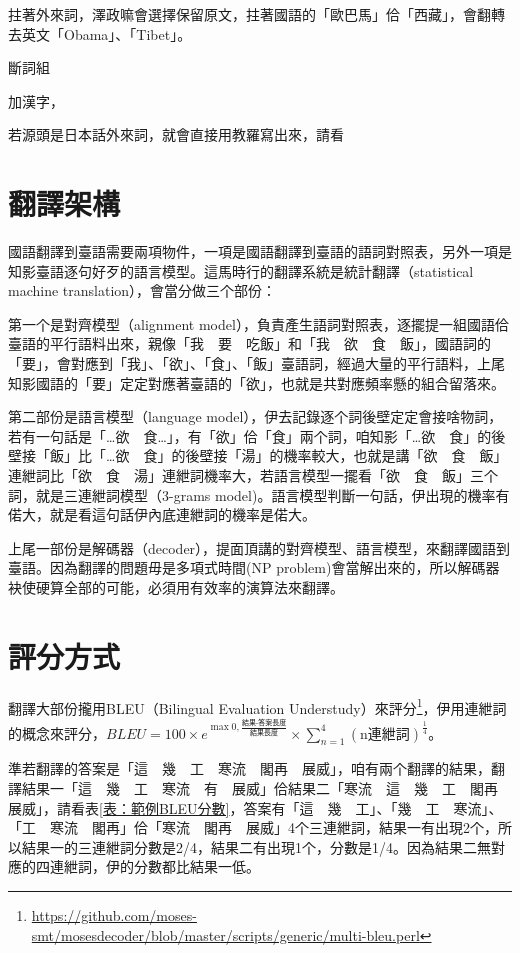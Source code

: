 \documentclass[final,oneside,onecolumn,12pt,a4paper]{book}%
\begin{document}
拄著外來詞，澤政嘛會選擇保留原文，拄著國語的「歐巴馬」佮「西藏」，會翻轉去英文「Obama」、「Tibet」。

斷詞組

加漢字，

若源頭是日本話外來詞，就會直接用教羅寫出來，請看

\section{翻譯架構}
\label{節：翻譯架構}
國語翻譯到臺語需要兩項物件，一項是國語翻譯到臺語的語詞對照表，另外一項是知影臺語逐句好歹的語言模型。這馬時行的翻譯系統是統計翻譯（statistical machine translation），會當分做三个部份：

第一个是對齊模型（alignment model），負責產生語詞對照表，逐擺提一組國語佮臺語的平行語料出來，親像「我　要　吃飯」和「我　欲　食　飯」，國語詞的「要」，會對應到「我」、「欲」、「食」、「飯」臺語詞，經過大量的平行語料，上尾知影國語的「要」定定對應著臺語的「欲」，也就是共對應頻率懸的組合留落來。

第二部份是語言模型（language model），伊去記錄逐个詞後壁定定會接啥物詞，若有一句話是「…欲　食…」，有「欲」佮「食」兩个詞，咱知影「…欲　食」的後壁接「飯」比「…欲　食」的後壁接「湯」的機率較大，也就是講「欲　食　飯」連紲詞比「欲　食　湯」連紲詞機率大，若語言模型一擺看「欲　食　飯」三个詞，就是三連紲詞模型（3-grams model)。語言模型判斷一句話，伊出現的機率有偌大，就是看這句話伊內底連紲詞的機率是偌大。

上尾一部份是解碼器（decoder），提面頂講的對齊模型、語言模型，來翻譯國語到臺語。因為翻譯的問題毋是多項式時間(NP problem)會當解出來的，所以解碼器袂使硬算全部的可能，必須用有效率的演算法來翻譯。

\section{評分方式}
\label{節：評分方式}

翻譯大部份攏用BLEU（Bilingual Evaluation Understudy）來評分\footnote{\url{https://github.com/moses-smt/mosesdecoder/blob/master/scripts/generic/multi-bleu.perl}}，伊用連紲詞的概念來評分，$BLEU=100\times{e^{\max{0,\frac{\textit{結果-答案長度}}{\textit{結果長度}}}}}\times{\sum_{n=1}^{4}(\textrm{n連紲詞})^{\frac{1}{4}}}$。

準若翻譯的答案是「這　幾　工　寒流　閣再　展威」，咱有兩个翻譯的結果，翻譯結果一「這　幾　工　寒流　有　展威」佮結果二「寒流　這　幾　工　閣再　展威」，請看表\ref{表：範例BLEU分數}，答案有「這　幾　工」、「幾　工　寒流」、「工　寒流　閣再」佮「寒流　閣再　展威」4个三連紲詞，結果一有出現2个，所以結果一的三連紲詞分數是2/4，結果二有出現1个，分數是1/4。因為結果二無對應的四連紲詞，伊的分數都比結果一低。
\end{document}

